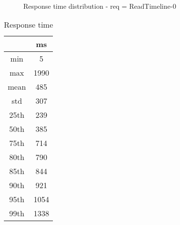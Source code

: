 \begin{minipage}{0.75\linewidth}
\begin{figure}[h]
\begin{adjustbox}{max width=1.0\linewidth, keepaspectratio}
  \end{adjustbox}
  \caption{Response time distribution - req = ReadTimeline-0}
\end{figure}
\end{minipage}\hfill\begin{minipage}{0.18\linewidth}
\begin{table}[h]
\begin{tabular}{|cc|}
\hline
\textbf{} & \textbf{ms}\\ \hline
 \Xhline{0.005\arrayrulewidth}
min & 5\\
 \Xhline{0.005\arrayrulewidth}
max & 1990\\
 \Xhline{0.005\arrayrulewidth}
mean & 485\\
 \Xhline{0.005\arrayrulewidth}
std & 307\\
\hline
\hline
 \Xhline{0.005\arrayrulewidth}
25th & 239\\
 \Xhline{0.005\arrayrulewidth}
50th & 385\\
 \Xhline{0.005\arrayrulewidth}
75th & 714\\
 \Xhline{0.005\arrayrulewidth}
80th & 790\\
 \Xhline{0.005\arrayrulewidth}
85th & 844\\
 \Xhline{0.005\arrayrulewidth}
90th & 921\\
 \Xhline{0.005\arrayrulewidth}
95th & 1054\\
 \Xhline{0.005\arrayrulewidth}
99th & 1338\\
\hline
\end{tabular}
\caption{Response time}
\end{table}
\end{minipage}\hfill